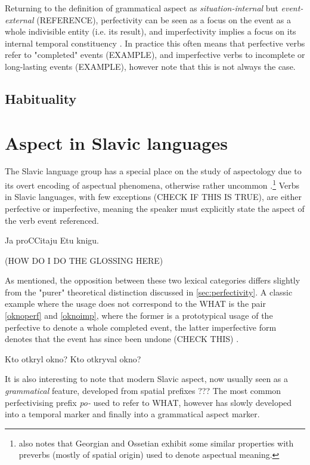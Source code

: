 Returning to the definition of grammatical aspect as \emph{situation-internal} but \emph{event-external} (REFERENCE), perfectivity can be seen as a focus on the event as a whole indivisible entity (i.e. its result), and imperfectivity implies a focus on its internal temporal constituency \citep{comrie1976aspect, wals-65}. In practice this often means that perfective verbs refer to "completed" events (EXAMPLE), and imperfective verbs to incomplete or long-lasting events (EXAMPLE), however note that this is not always the case.

\subsection*{Habituality}

\section{Aspect in Slavic languages}
The Slavic language group has a special place on the study of aspectology due to its overt encoding of aspectual phenomena, otherwise rather uncommon \citep{slavstyleaspect}.\footnote{\citet{slavstyleaspect} also notes that Georgian and Ossetian exhibit some similar properties with preverbs (mostly of spatial origin) used to denote aspectual meaning.} Verbs in Slavic languages, with few exceptions (CHECK IF THIS IS TRUE), are either perfective or imperfective, meaning the speaker must explicitly state the aspect of the verb event referenced. 

\begin{exe}
    \ex Ja proCCitaju Etu knigu.
\end{exe}

(HOW DO I DO THE GLOSSING HERE)

As mentioned, the opposition between these two lexical categories differs slightly from the "purer" theoretical distinction discussed in \ref{sec:perfectivity}. A classic example where the usage does not correspond to the WHAT is the pair \ref{oknoperf} and \ref{oknoimp}, where the former is a prototypical usage of the perfective to denote a whole completed event, the latter imperfective form denotes that the event has since been undone (CHECK THIS) \citep{franks2005slavic}.

\begin{exe}
    \ex Kto otkryl okno?
    \label{oknoperf}
    \ex Kto otkryval okno?
    \label{oknoimp}
\end{exe}

It is also interesting to note that modern Slavic aspect, now usually seen as a \emph{grammatical} feature, developed from spatial prefixes ??? The most common perfectivising prefix \emph{po-} used to refer to WHAT, however has slowly developed into a temporal marker and finally into a grammatical aspect marker.

